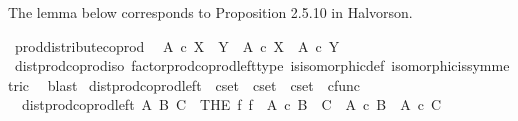 \begin{isabellebody}
%
\isadelimproof
%
\endisadelimproof
%
\begin{isamarkuptext}%
The lemma below corresponds to Proposition 2.5.10 in Halvorson.%
\end{isamarkuptext}\isamarkuptrue%
\isamarkupfalse%
\ prod{\isacharunderscore}{\kern0pt}distribute{\isacharunderscore}{\kern0pt}coprod{\isacharcolon}{\kern0pt}\isanewline
\ \ {\isachardoublequoteopen}A\ {\isasymtimes}\isactrlsub c\ {\isacharparenleft}{\kern0pt}X\ {\isasymCoprod}\ Y{\isacharparenright}{\kern0pt}\ {\isasymcong}\ {\isacharparenleft}{\kern0pt}A\ {\isasymtimes}\isactrlsub c\ X{\isacharparenright}{\kern0pt}\ {\isasymCoprod}\ {\isacharparenleft}{\kern0pt}A\ {\isasymtimes}\isactrlsub c\ Y{\isacharparenright}{\kern0pt}{\isachardoublequoteclose}\isanewline
%
\isadelimproof
\ \ %
\endisadelimproof
%
\isatagproof
{}\isamarkupfalse%
\ dist{\isacharunderscore}{\kern0pt}prod{\isacharunderscore}{\kern0pt}coprod{\isacharunderscore}{\kern0pt}iso\ factor{\isacharunderscore}{\kern0pt}prod{\isacharunderscore}{\kern0pt}coprod{\isacharunderscore}{\kern0pt}left{\isacharunderscore}{\kern0pt}type\ is{\isacharunderscore}{\kern0pt}isomorphic{\isacharunderscore}{\kern0pt}def\ isomorphic{\isacharunderscore}{\kern0pt}is{\isacharunderscore}{\kern0pt}symmetric\ \isamarkupfalse%
\ blast%
\endisatagproof
{\isafoldproof}%
%
\isadelimproof
%
\endisadelimproof
%
\isadelimdocument
%
\endisadelimdocument
%
\isatagdocument
%
\isamarkuptrue%
%
\endisatagdocument
{\isafolddocument}%
%
\isadelimdocument
%
\endisadelimdocument
{}\isamarkupfalse%
\ dist{\isacharunderscore}{\kern0pt}prod{\isacharunderscore}{\kern0pt}coprod{\isacharunderscore}{\kern0pt}left\ {\isacharcolon}{\kern0pt}{\isacharcolon}{\kern0pt}\ {\isachardoublequoteopen}cset\ {\isasymRightarrow}\ cset\ {\isasymRightarrow}\ cset\ {\isasymRightarrow}\ cfunc{\isachardoublequoteclose}\ \isanewline
\ \ {\isachardoublequoteopen}dist{\isacharunderscore}{\kern0pt}prod{\isacharunderscore}{\kern0pt}coprod{\isacharunderscore}{\kern0pt}left\ A\ B\ C\ {\isacharequal}{\kern0pt}\ {\isacharparenleft}{\kern0pt}THE\ f{\isachardot}{\kern0pt}\ f\ {\isacharcolon}{\kern0pt}\ A\ {\isasymtimes}\isactrlsub c\ {\isacharparenleft}{\kern0pt}B\ {\isasymCoprod}\ C{\isacharparenright}{\kern0pt}\ {\isasymrightarrow}\ {\isacharparenleft}{\kern0pt}A\ {\isasymtimes}\isactrlsub c\ B{\isacharparenright}{\kern0pt}\ {\isasymCoprod}\ {\isacharparenleft}{\kern0pt}A\ {\isasymtimes}\isactrlsub c\ C{\isacharparenright}{\kern0pt}\isanewline

\end{isabellebody}
